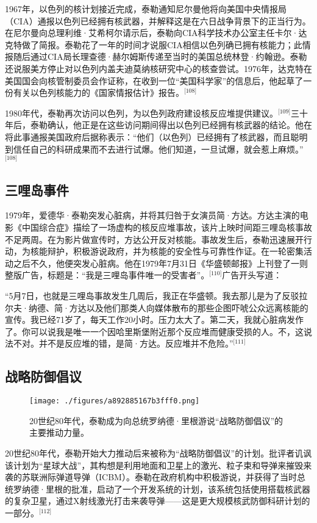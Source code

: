 1967年，以色列的核计划接近完成，泰勒通知尼尔曼他将向美国中央情报局（CIA）通报以色列已经拥有核武器，并解释这是在六日战争背景下的正当行为。在尼尔曼向总理利维·艾希柯尔请示后，泰勒向CIA科学技术办公室主任卡尔·达克特做了简报。泰勒花了一年的时间才说服CIA相信以色列确已拥有核能力；此情报随后通过CIA局长理查德·赫尔姆斯传递至当时的美国总统林登·约翰逊。泰勒还说服美方停止对以色列内盖夫迪莫纳核研究中心的核查尝试。1976年，达克特在美国国会向核管制委员会作证称，在收到一位“美国科学家”的信息后，他起草了一份有关以色列核能力的《国家情报估计》报告。\(^\text{[108]}\)

1980年代，泰勒再次访问以色列，为以色列政府建设核反应堆提供建议。\(^\text{[109]}\)三十年后，泰勒确认，他正是在这些访问期间得出以色列已经拥有核武器的结论。他在将此事通报美国政府后据称表示：“他们（以色列）已经拥有了核武器，而且聪明到信任自己的科研成果而不去进行试爆。他们知道，一旦试爆，就会惹上麻烦。”\(^\text{[108]}\)
\subsection{三哩岛事件}
1979年，爱德华·泰勒突发心脏病，并将其归咎于女演员简·方达。方达主演的电影《中国综合症》描绘了一场虚构的核反应堆事故，该片上映时间距三哩岛核事故不足两周。在为影片做宣传时，方达公开反对核能。事故发生后，泰勒迅速展开行动，为核能辩护，积极游说政府，并为核能的安全性与可靠性作证。在一轮密集活动之后不久，他便突发心脏病。他在1979年7月31日《华盛顿邮报》上刊登了一则整版广告，标题是：“我是三哩岛事件唯一的受害者”。\(^\text{[110]}\)广告开头写道：

“5月7日，也就是三哩岛事故发生几周后，我正在华盛顿。我去那儿是为了反驳拉尔夫·纳德、简·方达以及他们那类人向媒体散布的那些企图吓唬公众远离核能的宣传。我已经71岁了，每天工作20小时。压力太大了。第二天，我就心脏病发作了。你可以说我是唯一一个因哈里斯堡附近那个反应堆而健康受损的人。不，这说法不对。并不是反应堆的错，是简·方达。反应堆并不危险。”\(^\text{[111]}\)
\subsection{战略防御倡议}
\begin{figure}[ht]
\centering
\texttt{[image: ./figures/a892885167b3fff0.png]}
\caption{20世纪80年代，泰勒成为向总统罗纳德·里根游说“战略防御倡议”的主要推动力量。} \label{fig_ADHTL_15}
\end{figure}
20世纪80年代，泰勒开始大力推动后来被称为“战略防御倡议”的计划。批评者讥讽该计划为“星球大战”，其构想是利用地面和卫星上的激光、粒子束和导弹来摧毁来袭的苏联洲际弹道导弹（ICBM）。泰勒在政府机构中积极游说，并获得了当时总统罗纳德·里根的批准，启动了一个开发系统的计划，该系统包括使用搭载核武器的复杂卫星，通过X射线激光打击来袭导弹——这是更大规模核武防御科研计划的一部分。\(^\text{[112]}\)

